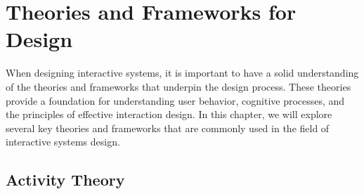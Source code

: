 \chapter{Theories and Frameworks for Design}

When designing interactive systems, it is important to have a solid understanding of the theories and frameworks that underpin the design process. These theories provide a foundation for understanding user behavior, cognitive processes, and the principles of effective interaction design. In this chapter, we will explore several key theories and frameworks that are commonly used in the field of interactive systems design.

\section{Activity Theory}


